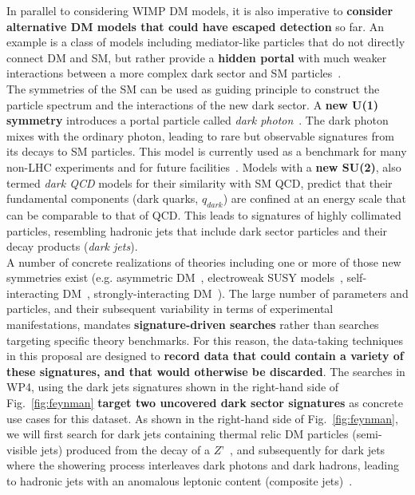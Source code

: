 In parallel to considering WIMP DM models, it is also imperative to \textbf{consider alternative DM models that could have escaped detection} so far. 
An example is a class of models including mediator-like particles that do not directly connect DM and SM, but rather provide a \textbf{hidden portal} with much weaker interactions between a more complex dark sector and SM particles~\cite{Strassler:2006im}. 
\\
\indent
The symmetries of the SM can be used as guiding principle to construct the particle spectrum and the interactions of the new dark sector. 
A \textbf{new U(1) symmetry} introduces a portal particle called \textit{dark photon}~\cite{Holdom:1985ag,Curtin:2014cca}.   
The dark photon mixes with the ordinary photon, leading to rare but observable signatures from its decays to SM particles. 
This model is currently used as a benchmark for many non-LHC experiments and for future facilities~\cite{Strategy:2019vxc}. 
Models with a \textbf{new SU(2)}, also termed \textit{dark QCD} models for their similarity with SM QCD, predict that their fundamental components (dark quarks, $q_{dark}$) are confined at an energy scale that can be comparable to that of QCD. 
This leads to signatures of highly collimated particles, resembling hadronic jets that include dark sector particles and their decay products (\textit{dark jets}). 
\\
\indent
A number of concrete realizations of theories including one or more of those new symmetries exist (e.g. asymmetric DM~\cite{Zurek:2013wia}, electroweak SUSY models~\cite{Cheung:2009su}, self-interacting DM~\cite{Tulin:2017ara}, strongly-interacting DM~\cite{Bernreuther:2019pfb}). 
The large number of parameters and particles, and their subsequent variability in terms of experimental manifestations, mandates \textbf{signature-driven searches} rather than searches targeting specific theory benchmarks. 
For this reason, the data-taking techniques in this proposal are designed to \textbf{record data that could contain a variety of these signatures, and that would otherwise be discarded}. The searches in WP4, using the dark jets signatures shown in the right-hand side of Fig.~\ref{fig:feynman} \textbf{target two uncovered dark sector signatures} as concrete use cases for this dataset. As shown in the right-hand side of Fig.~\ref{fig:feynman}, we will first search for dark jets containing thermal relic DM particles (semi-visible jets) produced from the decay of a $Z’$~\cite{Bernreuther:2019pfb,Cohen:2017pzm}, and subsequently for dark jets where the showering process interleaves dark photons and dark hadrons, leading to hadronic jets with an anomalous leptonic content (composite jets)~\cite{Cheung:2009su,Park:2017rfb}.
%

